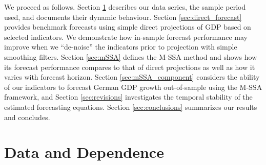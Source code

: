 \documentclass[11pt,a4paper]{article}
\begin{document}

We proceed as follows. Section \ref{sec:data} describes our data series, the sample period used, and documents their dynamic behaviour. Section \ref{sec:direct_forecast} provides benchmark forecasts using simple direct projections of GDP based on selected indicators. We demonstrate how in-sample forecast performance may improve when we ``de-noise'' the indicators prior to projection with simple smoothing filters. Section \ref{sec:mSSA} defines the M-SSA method and shows how its forecast performance compares to that of direct projections as well as how it varies with forecast horizon. 
Section \ref{sec:mSSA_component} considers the ability of our indicators to forecast German GDP growth out-of-sample using the M-SSA framework, and Section \ref{sec:revisions} investigates the temporal stability of the estimated forecasting equations. 
Section \ref{sec:conclusions} summarizes our results and concludes.



\section{Data and Dependence}\label{sec:data}
\end{document}
